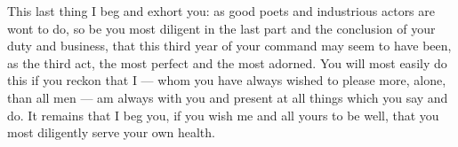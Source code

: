 This last thing I beg and exhort you: as good poets and industrious actors are wont to do, so be you most diligent in the last part and the conclusion of your duty and business, that this third year of your command may seem to have been, as the third act, the most perfect and the most adorned. You will most easily do this if you reckon that I --- whom you have always wished to please more, alone, than all men --- am always with you and present at all things which you say and do. It remains that I beg you, if you wish me and all yours to be well, that you most diligently serve your own health.
